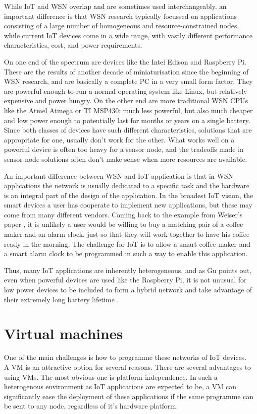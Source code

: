 While IoT and WSN overlap and are sometimes used interchangeably, an important difference is that WSN research typically focussed on applications consisting of a large number of homogeneous and resource-constrained nodes, while current IoT devices come in a wide range, with vastly different performance characteristics, cost, and power requirements.

On one end of the spectrum are devices like the Intel Edison and Raspberry Pi. These are the results of another decade of miniaturisation since the beginning of WSN research, and are basically a complete PC in a very small form factor. They are powerful enough to run a normal operating system like Linux, but relatively expensive and power hungry. On the other end are more traditional WSN CPUs like the Atmel Atmega or TI MSP430: much less powerful, but also much cheaper and low power enough to potentially last for months or years on a single battery. Since both classes of devices have such different characteristics, solutions that are appropriate for one, usually don't work for the other. What works well on a powerful device is often too heavy for a sensor node, and the tradeoffs made in sensor node solutions often don't make sense when more resources are available.

An important difference between WSN and IoT application is that in WSN applications the network is usually dedicated to a specific task and the hardware is an integral part of the design of the application. In the broadest IoT vision, the smart devices a user has cooperate to implement new applications, but these may come from many different vendors. Coming back to the example from Weiser's paper \cite{Weiser:1991wz}, it is unlikely a user would be willing to buy a matching pair of a coffee maker and an alarm clock, just so that they will work together to have his coffee ready in the morning. The challenge for IoT is to allow a smart coffee maker and a smart alarm clock to be programmed in such a way to enable this application.

Thus, many IoT applications are inherently heterogeneous, and as Gu points out, even when powerful devices are used like the Raspberry Pi, it is not unusual for low power devices to be included to form a hybrid network and take advantage of their extremely long battery lifetime \cite{Gu:2006ww}.

\section{Virtual machines}
One of the main challenges is how to programme these networks of IoT devices. A VM is an attractive option for several reasons. There are several advantages to using VMs. The most obvious one is platform independence. In such a heterogenous environment as IoT applications are expected to be, a VM can significantly ease the deployment of these applications if the same programme can be sent to any node, regardless of it's hardware platform.

